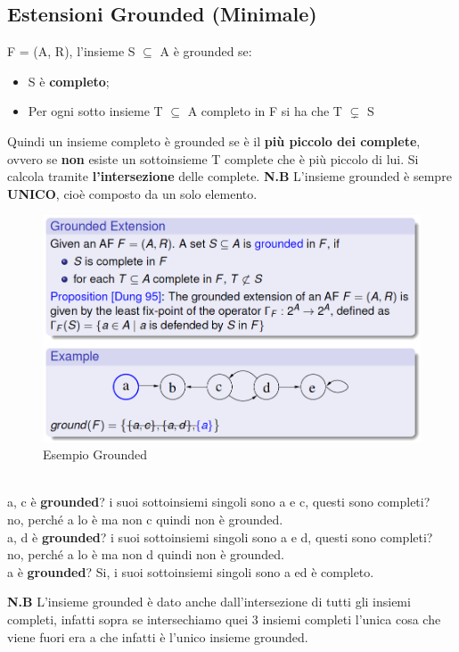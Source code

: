 \subsection{Estensioni Grounded (Minimale)}
F = (A, R), l'insieme S $\subseteq$ A è grounded se:
\begin{itemize}
    \item S è \textbf{completo};
    \item Per ogni sotto insieme T $\subseteq$ A completo in F si ha che T
          $\subsetneq$ S
\end{itemize}
Quindi un insieme completo è grounded se è il \textbf{più piccolo dei complete},
ovvero se \textbf{non} esiste un sottoinsieme T complete che è più piccolo di
lui. Si calcola tramite \textbf{l'intersezione} delle complete. \textbf{N.B}
L'insieme grounded è sempre \textbf{UNICO}, cioè composto da un solo elemento.
\begin{figure}[htp]
    \centering
    \includegraphics[width=12cm, keepaspectratio]{img/Cap6/grounded.png}
    \caption{Esempio Grounded}
\end{figure}
\\a, c è \textbf{grounded}? i suoi sottoinsiemi singoli sono a e c, questi sono
completi? \\no, perché a lo è ma non c quindi non è grounded. \\a, d è
\textbf{grounded}? i suoi sottoinsiemi singoli sono a e d, questi sono completi?
\\no, perché a lo è ma non d quindi non è grounded. \\a è \textbf{grounded}? Si,
i suoi sottoinsiemi singoli sono a ed è completo.

\vspace{0.8cm}

\textbf{N.B} L'insieme grounded è dato anche dall'intersezione di tutti gli
insiemi completi, infatti sopra se intersechiamo quei 3 insiemi completi l'unica
cosa che viene fuori era a che infatti è l'unico insieme grounded.

